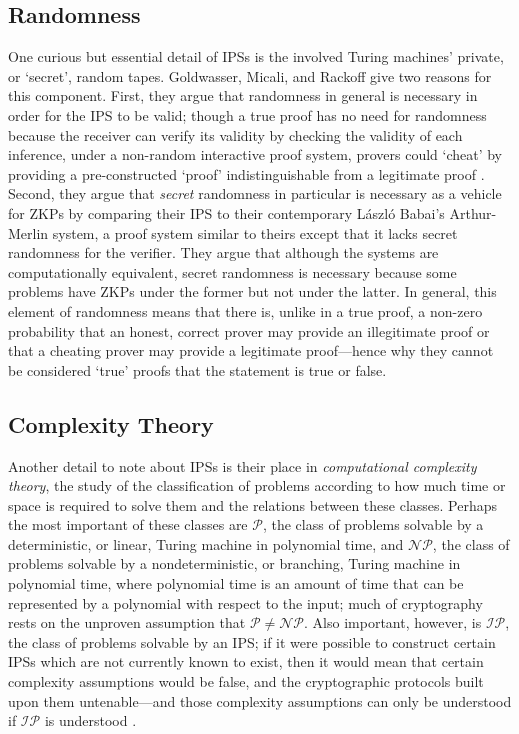 \documentclass{article}
\begin{document}
\begin{adjustwidth}{0.5in}{0in}
\subsection{Randomness}

One curious but essential detail of IPSs is the involved Turing machines' private, or `secret', random tapes. Goldwasser, Micali, and Rackoff give two reasons for this component. First, they argue that randomness in general is necessary in order for the IPS to be valid; though a true proof has no need for randomness because the receiver can verify its validity by checking the validity of each inference, under a non-random interactive proof system, provers could `cheat' by providing a pre-constructed `proof' indistinguishable from a legitimate proof \cite{GMR}. Second, they argue that \textit{secret} randomness in particular is necessary as a vehicle for ZKPs by comparing their IPS to their contemporary László Babai's Arthur-Merlin system, a proof system similar to theirs except that it lacks secret randomness for the verifier. They argue that although the systems are computationally equivalent, secret randomness is necessary because some problems have ZKPs under the former but not under the latter. In general, this element of randomness means that there is, unlike in a true proof, a non-zero probability that an honest, correct prover may provide an illegitimate proof or that a cheating prover may provide a legitimate proof---hence why they cannot be considered `true' proofs that the statement is true or false.


\subsection{Complexity Theory}

Another detail to note about IPSs is their place in \textit{computational complexity theory}, the study of the classification of problems according to how much time or space is required to solve them and the relations between these classes. Perhaps the most important of these classes are $\mathcal{P}$, the class of problems solvable by a deterministic, or linear, Turing machine in polynomial time, and $\mathcal{NP}$, the class of problems solvable by a nondeterministic, or branching, Turing machine in polynomial time, where polynomial time is an amount of time that can be represented by a polynomial with respect to the input; much of cryptography rests on the unproven assumption that $\mathcal{P} \neq \mathcal{NP}$. Also important, however, is $\mathcal{IP}$, the class of problems solvable by an IPS; if it were possible to construct certain IPSs which are not currently known to exist, then it would mean that certain complexity assumptions would be false, and the cryptographic protocols built upon them untenable---and those complexity assumptions can only be understood if $\mathcal{IP}$ is understood \cite{GMR}.


\end{adjustwidth}
\end{document}
